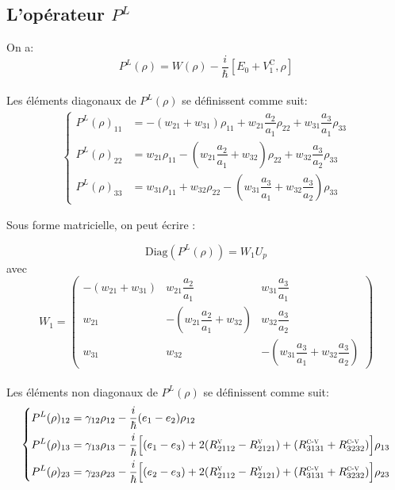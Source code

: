 \documentclass[12pt,a4paper,openany,oneside]{book}
\begin{document}
{{{{{{\subsection{L'opérateur $  P^{L} $}

On a:
\begin{equation}\label{second membre linéaire} 
P^{L}(\rho)= W(\rho)-\dfrac{i}{\hbar}[E_{0}+V_{1}^{\textrm{C}},\rho]
\end{equation}\\

Les éléments diagonaux de $ P^{L}(\rho) $ se définissent comme suit:
 \begin{eqnarray*}
 \left\{
 \begin{split}
 P^{L}(\rho)_{11} & =  -(w_{21} + w_{31})\rho_{11} + w_{21}\dfrac{a_{2}}{a_{1}}\rho_{22}+ w_{31}\dfrac{a_{3}}{a_{1}}\rho_{33} \\
P^{L}(\rho)_{22} & = w_{21}\rho_{11}-(w_{21}\dfrac{a_{2}}{a_{1}} + w_{32})\rho_{22} + w_{32}\dfrac{a_{3}}{a_{2}}\rho_{33} \\
 P^{L}(\rho)_{33} & =  w_{31}\rho_{11}+ w_{32}\rho_{22}-(w_{31}\dfrac{a_{3}}{a_{1}} + w_{32}\dfrac{a_{3}}{a_{2}})\rho_{33}  
  \end{split}  
   \right.   
  \end{eqnarray*}

 Sous forme matricielle, on peut écrire :

\begin{equation}\label{FM1}
\textrm{Diag}(P^{L}(\rho))= W_{1}U_{p}
\end{equation}
avec
$$
 W_{1}= 
\begin{pmatrix}
-(w_{21} + w_{31}) & w_{21}\dfrac{a_{2}}{a_{1}} & w_{31}\dfrac{a_{3}}{a_{1}}\\
            w_{21} & -(w_{21}\dfrac{a_{2}}{a_{1}} + w_{32}) & w_{32}\dfrac{a_{3}}{a_{2}}\\
            w_{31} &                                 w_{32} & -(w_{31}\dfrac{a_{3}}{a_{1}} + w_{32}\dfrac{a_{3}}{a_{2}})
\end{pmatrix}
$$\\

Les éléments non diagonaux de $ P^{L}(\rho) $ se définissent comme suit:
 \begin{equation*}
  \left\{
  \begin{split}
P^{L}(\rho)_{12} &= \gamma_{12}\rho_{12}-\dfrac{i}{\hbar}(e_{1}-e_{2})\rho_{12} \\
P^{L}(\rho)_{13} &= \gamma_{13}\rho_{13}-\dfrac{i}{\hbar}\Big[(e_{1}-e_{3})+2(R^{\textsc{v}}_{2112}-R^{\textsc{v}}_{2121})+(R^{\textsc{c-v}}_{3131} + R^{\textsc{c-v}}_{3232})\Big]\rho_{13}\\ 
P^{L}(\rho)_{23} &= \gamma_{23}\rho_{23}-\dfrac{i}{\hbar}\Big[(e_{2}-e_{3})+2(R^{\textsc{v}}_{2112}-R^{\textsc{v}}_{2121})+(R^{\textsc{c-v}}_{3131} + R^{\textsc{c-v}}_{3232})\Big]\rho_{23}
  \end{split}
  \right.
  \end{equation*}

}}}}}}
\end{document}
